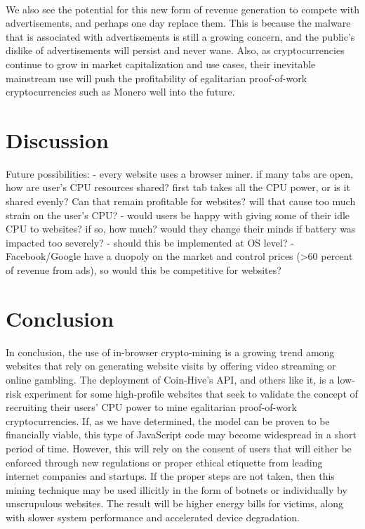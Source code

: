\\
We also see the potential for this new form of revenue generation to compete with advertisements, and perhaps one day replace them. This is because the malware that is associated with advertisements is still a growing concern, and the public’s dislike of advertisements will persist and never wane. Also, as cryptocurrencies continue to grow in market capitalization and use cases, their inevitable mainstream use will push the profitability of egalitarian proof-of-work cryptocurrencies such as Monero well into the future.

\begin{center}
\end{center}

\section{Discussion}
Future possibilities:
	- every website uses a browser miner. if many tabs are open, how are user's CPU resources shared? first tab takes all the CPU 		power, or is it shared evenly? Can that remain profitable for websites? will that cause too much strain on the user's CPU?
	- would users be happy with giving some of their idle CPU to websites? if so, how much? would they change their minds if battery 	was impacted too severely?
	- should this be implemented at OS level?
	- Facebook/Google have a duopoly on the market and control prices (>60 percent of revenue from ads), so would this be 			competitive for websites?

\section{Conclusion}
In conclusion, the use of in-browser crypto-mining is a growing trend among websites that rely on generating website visits by offering video streaming or online gambling. The deployment of Coin-Hive’s API, and others like it, is a low-risk experiment for some high-profile websites that seek to validate the concept of recruiting their users’ CPU power to mine egalitarian proof-of-work cryptocurrencies. If, as we have determined, the model can be proven to be financially viable, this type of JavaScript code may become widespread in a short period of time. However, this will rely on the consent of users that will either be enforced through new regulations or proper ethical etiquette from leading internet companies and startups. If the proper steps are not taken, then this mining technique may be used illicitly in the form of botnets or individually by unscrupulous websites. The result will be higher energy bills for victims, along with slower system performance and accelerated device degradation.
